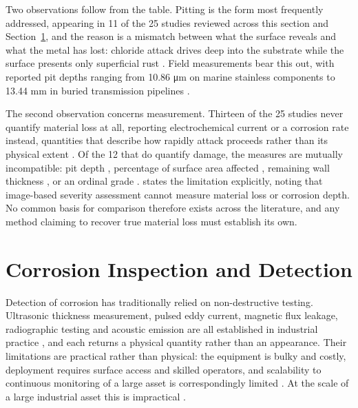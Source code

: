 \endgroup

Two observations follow from the table. Pitting is the form most frequently
addressed, appearing in 11 of the 25 studies reviewed across this section and
Section~\ref{sec:lr-corrosion-detection}, and the reason is a mismatch between
what the surface reveals and what the metal has lost: chloride attack drives
deep into the substrate while the surface presents only superficial rust
\citep{Nguyen2026,Akhlaghi2023}. Field measurements bear this out, with reported pit depths ranging
from 10.86 \si{\micro\meter} on marine stainless components \citep{Wang2021} to 13.44 mm
in buried transmission pipelines \citep{Akhlaghi2023}.

The second observation concerns measurement. Thirteen of the 25 studies never
quantify material loss at all, reporting electrochemical current or a corrosion
rate instead, quantities that describe how rapidly attack proceeds rather than
its physical extent \citep{Liang2021}. Of the 12 that do quantify damage, the measures
are mutually incompatible: pit depth \citep{Qin2026,Liu2026,Wang2021,Akhlaghi2023}, percentage of surface area
affected \citep{Alvani2026}, remaining wall thickness \citep{Yang2025}, or an ordinal grade
\citep{Arias2025,Bui2026,Ding2025}. \citet{Alvani2026} states the limitation explicitly, noting that
image-based severity assessment cannot measure material loss or corrosion depth.
No common basis for comparison therefore exists across the literature, and any
method claiming to recover true material loss must establish its own.

\section{Corrosion Inspection and Detection}
\label{sec:lr-corrosion-detection}

Detection of corrosion has traditionally relied on non-destructive testing.
Ultrasonic thickness measurement, pulsed eddy current, magnetic flux leakage,
radiographic testing and acoustic emission are all established in industrial
practice \citep{Huang2026a,Yang2026a,Yang2025}, and each returns a physical quantity rather than an
appearance. Their limitations are practical rather than physical: the equipment
is bulky and costly, deployment requires surface access and skilled operators,
and scalability to continuous monitoring of a large asset is correspondingly
limited \citep{Alvani2026}. At the scale of a large industrial asset this is
impractical \citep{Imran2025}.

